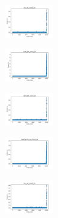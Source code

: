 \vspace*{\fill}
\newpage
\vspace*{\fill}

\begin{figure}[H]    
    \centering
    \begin{subfigure}
        \centering
        \includegraphics[width=0.234\textwidth]{img/HS-LS-v2/iris_set_const_20_949004259_time.png}
    \end{subfigure}
    \hfill
    \begin{subfigure}
        \centering
        \includegraphics[width=0.234\textwidth]{img/HS-LS-v2/ecoli_set_const_20_949004259_time.png}
    \end{subfigure}
    \hfill
    \begin{subfigure}
        \centering
        \includegraphics[width=0.234\textwidth]{img/HS-LS-v2/rand_set_const_20_949004259_time.png}
    \end{subfigure}
    \hfill
    \begin{subfigure}
        \centering
        \includegraphics[width=0.234\textwidth]{img/HS-LS-v2/newthyroid_set_const_20_949004259_time.png}
    \end{subfigure}
    \hfill
    \begin{subfigure}
        \centering
        \includegraphics[width=0.234\textwidth]{img/HS-LS-v2/iris_set_const_20_589741062_time.png}

\end{subfigure}
\end{figure}
